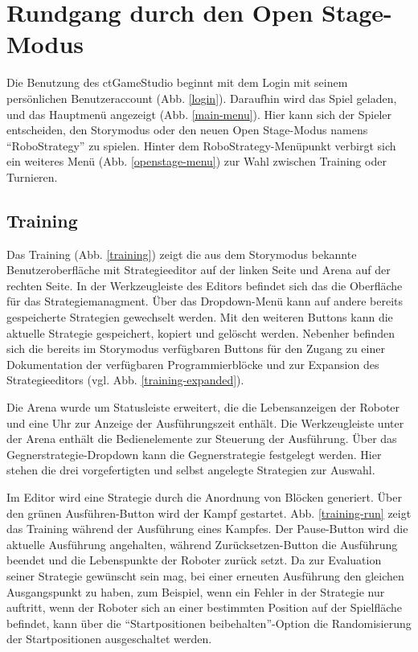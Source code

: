 \chapter{Rundgang durch den Open Stage-Modus}

Die Benutzung des ctGameStudio beginnt mit dem Login mit seinem persönlichen Benutzeraccount (Abb.
\ref{login}). Daraufhin wird das Spiel geladen, und das Hauptmenü angezeigt (Abb.  \ref{main-menu}).
Hier kann sich der Spieler entscheiden, den Storymodus oder den neuen Open Stage-Modus namens
\enquote{RoboStrategy} zu spielen. Hinter dem RoboStrategy-Menüpunkt verbirgt sich ein weiteres Menü
(Abb. \ref{openstage-menu}) zur Wahl zwischen Training oder Turnieren.

\section{Training}

Das Training (Abb. \ref{training}) zeigt die aus dem Storymodus bekannte Benutzeroberfläche mit
Strategieeditor auf der linken Seite und Arena auf der rechten Seite. In der Werkzeugleiste des
Editors befindet sich das die Oberfläche für das Strategiemanagment. Über das Dropdown-Menü kann auf
andere bereits gespeicherte Strategien gewechselt werden. Mit den weiteren Buttons kann die aktuelle
Strategie gespeichert, kopiert und gelöscht werden. Nebenher befinden sich die bereits im Storymodus
verfügbaren Buttons für den Zugang zu einer Dokumentation der verfügbaren Programmierblöcke und zur
Expansion des Strategieeditors (vgl. Abb. \ref{training-expanded}).

Die Arena wurde um Statusleiste erweitert, die die Lebensanzeigen der Roboter und eine Uhr zur
Anzeige der Ausführungszeit enthält. Die Werkzeugleiste unter der Arena enthält die Bedienelemente
zur Steuerung der Ausführung. Über das
Gegnerstrategie-Dropdown kann die Gegnerstrategie festgelegt werden. Hier stehen die drei
vorgefertigten und selbst angelegte Strategien zur Auswahl.

Im Editor wird eine Strategie durch die Anordnung von Blöcken generiert. Über den grünen
Ausführen-Button wird der Kampf gestartet. Abb. \ref{training-run} zeigt das Training während der
Ausführung eines Kampfes. Der Pause-Button wird die aktuelle Ausführung angehalten, während
Zurücksetzen-Button die Ausführung beendet und die Lebenspunkte der Roboter zurück setzt. Da zur
Evaluation seiner Strategie gewünscht sein mag, bei einer erneuten Ausführung den gleichen
Ausgangspunkt zu haben, zum Beispiel, wenn ein Fehler in der Strategie nur auftritt, wenn der
Roboter sich an einer bestimmten Position auf der Spielfläche befindet, kann über die
\enquote{Startpositionen beibehalten}-Option die Randomisierung der Startpositionen ausgeschaltet
werden.


